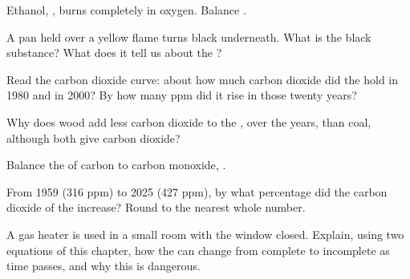 \begin{exercise}[$\star\star$]\label{exo:g8:combustion-and-fuels:6}
Ethanol, , burns completely in oxygen. Balance
. %
\end{exercise}

\begin{exercise}[$\star\star$]\label{exo:g8:combustion-and-fuels:7}
A pan held over a yellow flame turns black underneath. What is the black
substance? What does it tell us about the ?
\end{exercise}

\begin{exercise}[$\star\star$]\label{exo:g8:combustion-and-fuels:8}
Read the carbon dioxide curve: about how much carbon dioxide did the 
hold in 1980 and in 2000? By how many ppm did it rise in those twenty
years?
\end{exercise}

\begin{exercise}[$\star\star$]\label{exo:g8:combustion-and-fuels:9}
Why does  wood add less carbon dioxide to the , over the years,
than  coal, although both give carbon dioxide?
\end{exercise}

\begin{exercise}[$\star\star$]\label{exo:g8:combustion-and-fuels:10}
Balance the  of carbon to carbon monoxide,
. %
\end{exercise}

\begin{exercise}[$\star\star\star$]\label{exo:g8:combustion-and-fuels:11}
From 1959 (316 ppm) to 2025 (427 ppm), by what percentage did the
carbon dioxide of the  increase? Round to the nearest whole number.
\end{exercise}

\begin{exercise}[$\star\star\star$]\label{exo:g8:combustion-and-fuels:12}
A gas heater is used in a small room with the window closed. Explain,
using two equations of this chapter, how the  can change from
complete to incomplete as time passes, and why this is dangerous.
\end{exercise}

